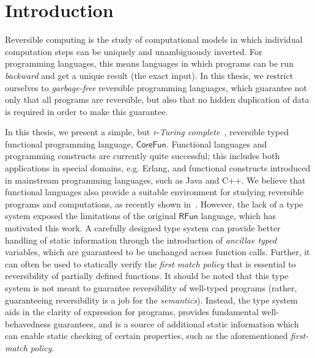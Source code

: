 \documentclass[a4paper,10p,openright]{memoir}
\def\rfunc{\ensuremath{\mathsf{CoreFun}}\xspace}
\def\rfun{\ensuremath{\mathsf{RFun}}\xspace}
\begin{document}
\cleardoublepage
{}
\tableofcontents*

\cleardoublepage
{}
\setcounter{page}{1}


\chapter{Introduction}

Reversible computing is the study of computational models in which individual
computation steps can be uniquely and unambiguously inverted. For programming
languages, this means languages in which programs can be run \emph{backward}
and get a unique result (the exact input). In this thesis, we restrict ourselves
to \emph{garbage-free} reversible programming languages, which guarantee not
only that all programs are reversible, but also that no hidden duplication of
data is required in order to make this guarantee.

In this thesis, we present a simple, but \emph{r-Turing
complete}~\cite{AxelsenGlueck:2016}, reversible typed functional programming
language, \rfunc. Functional languages and programming constructs are currently
quite successful; this includes both applications in special domains, e.g.
Erlang, and functional constructs introduced in mainstream programming
languages, such as Java and C++. We believe that functional languages also
provide a suitable environment for studying reversible programs and
computations, as recently shown in~\cite{ThomsenAxelsen:2016:IFL}. However, the
lack of a type system exposed the limitations of the original \rfun language,
which has motivated this work. A carefully designed type system can provide
better handling of static information through the introduction of
\emph{ancillae typed} variables, which are guaranteed to be unchanged across
function calls. Further, it can often be used to statically verify the
\emph{first match policy} that is essential to reversibility of partially
defined functions. It should be noted that this type system is not meant to
guarantee reversibility of well-typed programs (rather, guaranteeing
reversibility is a job for the \emph{semantics}). Instead, the type system aids
in the clarity of expression for programs, provides fundamental
well-behavedness guarantees, and is a source of additional static information
which can enable static checking of certain properties, such as the
aforementioned \emph{first-match policy}.
\end{document}
